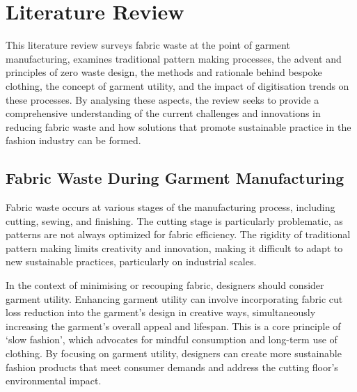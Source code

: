 \chapter{Literature Review}
This literature review surveys fabric waste at the point of garment manufacturing, examines traditional pattern making processes, the advent and principles of zero waste design, the methods and rationale behind bespoke clothing, the concept of garment utility, and the impact of digitisation trends on these processes. By analysing these aspects, the review seeks to provide a comprehensive understanding of the current challenges and innovations in reducing fabric waste and how solutions that promote sustainable practice in the fashion industry can be formed.

\section{Fabric Waste During Garment Manufacturing}
Fabric waste occurs at various stages of the manufacturing process, including cutting, sewing, and finishing. The cutting stage is particularly problematic, as patterns are not always optimized for fabric efficiency. The rigidity of traditional pattern making limits creativity and innovation, making it difficult to adapt to new sustainable practices, particularly on industrial scales.

In the context of minimising or recouping fabric, designers should consider garment utility. Enhancing garment utility can involve incorporating fabric cut loss reduction into the garment’s design in creative ways, simultaneously increasing the garment’s overall appeal and lifespan. This is a core principle of ‘slow fashion’, which advocates for mindful consumption and long-term use of clothing. By focusing on garment utility, designers can create more sustainable fashion products that meet consumer demands and address the cutting floor's environmental impact.

